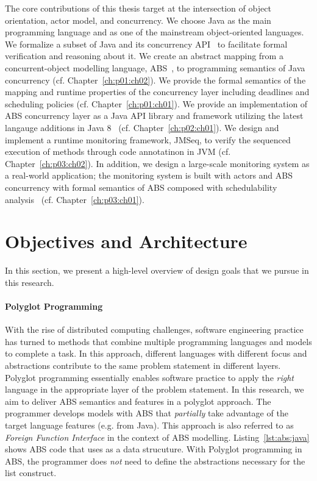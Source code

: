 The core contributions of this thesis target at the intersection of object 
orientation, actor model, and concurrency.
We choose Java as the main programming language and as one of the mainstream 
object-oriented languages. 
We formalize a subset of Java and its concurrency API~\cite{jsr166} to 
facilitate formal verification and reasoning about it.
We create an abstract mapping from a concurrent-object modelling language, 
ABS~\cite{johnsen2012abs}, to programming semantics of Java concurrency (cf. Chapter~\ref{ch:p01:ch02}). 
We provide the formal semantics of the mapping and runtime properties of 
the concurrency layer including deadlines and scheduling policies (cf. Chapter~\ref{ch:p01:ch01}).
We provide an implementation of ABS concurrency layer as a Java API library 
and framework utilizing the latest langauge additions 
in Java 8~\cite{jsr335:lambda:translation} (cf. Chapter~\ref{ch:p02:ch01}).
We design and implement a runtime monitoring framework, JMSeq, to verify the
sequenced execution of methods through code annotatinon in JVM (cf. Chapter~\ref{ch:p03:ch02}). 
In addition, we design a large-scale monitoring system as a real-world 
application; the monitoring system is built with actors and ABS concurrency 
with formal semantics of ABS composed with schedulability 
analysis~\cite{fersman2007task} (cf. Chapter~\ref{ch:p03:ch01}).

\section{Objectives and Architecture}
\label{sec:intro:arch:crit}

In this section, we present a high-level overview of design goals that we pursue in this research. 

\paragraph{Polyglot Programming}
With the rise of distributed computing challenges, software engineering practice has turned to methods that combine multiple programming languages and models to complete a task. 
In this approach, different languages with different focus and abstractions contribute to the same problem statement in different layers. 
Polyglot programming essentially enables software practice to apply the \emph{right} language in the appropriate layer of the problem statement. 
In this research, we aim to deliver ABS semantics and features in a polyglot approach. 
The programmer develops models with ABS that \emph{partially} take advantage of the target language features (e.g. from Java).
This approach is also referred to as \emph{Foreign Function Interface} in the context of ABS modelling.
Listing~\ref{lst:abs:java} shows ABS code that uses  as a data strucuture.
With Polyglot programming in ABS, the programmer does \emph{not} need to define the abstractions necessary for the list construct. 

